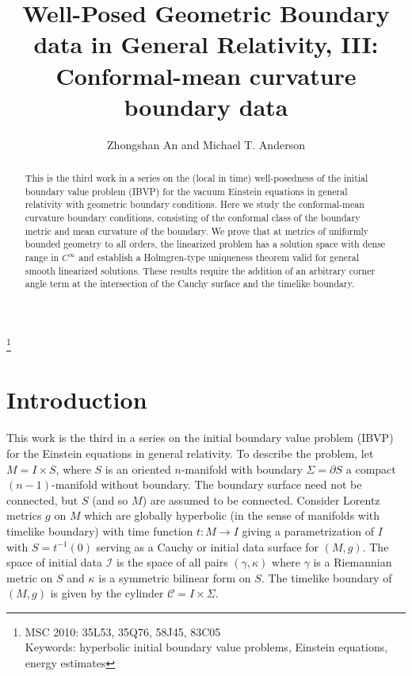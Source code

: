 \documentclass[10pt]{amsart}
\newcommand{\g}{\gamma}
\newcommand{\Si}{\Sigma}
\renewcommand{\k}{\kappa}
\newcommand{\cC}{{\mathcal C}}
\newcommand{\cI}{\mathcal I}
\newcommand{\p}{\partial}
\renewcommand{\to}{\rightarrow}
\newcommand{\<}{\langle}
\renewcommand{\>}{\rangle}
\theoremstyle{plain}
\theoremstyle{remark}
\theoremstyle{definition}
\numberwithin{equation}{section}
\begin{document}
\title[ ]{Well-Posed Geometric Boundary data in General Relativity, III: \\
Conformal-mean curvature boundary data}

\author{Zhongshan An and Michael T. Anderson}

\address{Institute of Geometry and Physics, 
University of Science and Technology of China,
No. 99 Xiupu Road, Shanghai, China, 201305}

\address{Department of Mathematics, 
Stony Brook University,
Stony Brook, NY 11794}


\begin{abstract} 
  This is the third work in a series on the (local in time) well-posedness of the initial boundary value problem (IBVP) for the vacuum Einstein equations in 
general relativity with geometric boundary conditions. Here we study the conformal-mean curvature boundary conditions, consisting of the conformal 
class of the boundary metric and mean curvature of the boundary. We prove that at metrics of uniformly bounded geometry to all orders, the linearized 
problem has a solution space with dense range in $C^{\infty}$ and establish a Holmgren-type uniqueness theorem valid for general smooth linearized solutions. 
These results require the addition of an arbitrary corner angle term at the intersection of the Cauchy surface and the timelike boundary. 
\end{abstract}

\thanks{MSC 2010: 35L53, 35Q76, 58J45, 83C05\\
Keywords: hyperbolic initial boundary value problems, Einstein equations, energy estimates}



\maketitle 


\section{Introduction}

   This work is the third in a series on the initial boundary value problem (IBVP) for the Einstein equations in general relativity. To describe the problem, let 
$M = I\times S$, where $S$ is an oriented $n$-manifold with boundary $\Si = \p S$ a compact $(n-1)$-manifold without boundary. The boundary surface 
need not be connected, but $S$ (and so $M$) are assumed to be connected. Consider Lorentz metrics $g$ on $M$ which are globally hyperbolic (in the sense of 
manifolds with timelike boundary) with time function $t: M \to I$ giving a parametrization of $I$ with $S = t^{-1}(0)$ serving as a Cauchy or initial data 
surface for $(M, g)$. The space of initial data $\cI$ is the space of all pairs $(\g, \k)$ where $\g$ is a Riemannian metric on $S$ and $\k$ is a symmetric 
bilinear form on $S$. The timelike boundary of $(M,g)$ is given by the cylinder $\cC = I\times \Si$. 
\end{document}
